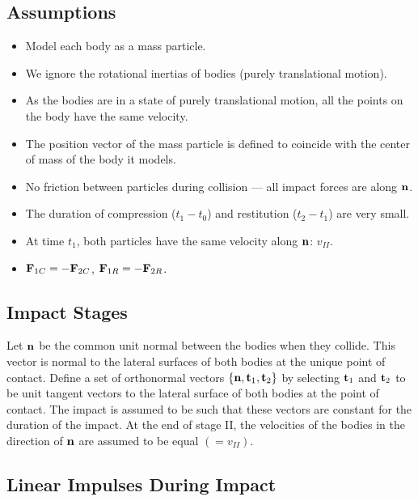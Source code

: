 \documentclass[
  letterpaper,
  DIV=11,
  numbers=noendperiod]{scrreprt}
\providecommand{\tightlist}{%
  \setlength{\itemsep}{0pt}\setlength{\parskip}{0pt}}
\begin{document}
\subsection{Assumptions}\label{assumptions}

\begin{itemize}
\tightlist
\item
  Model each body as a mass particle.
\item
  We ignore the rotational inertias of bodies (purely translational
  motion).
\item
  As the bodies are in a state of purely translational motion, all the
  points on the body have the same velocity.
\item
  The position vector of the mass particle is defined to coincide with
  the center of mass of the body it models.
\item
  No friction between particles during collision --- all impact forces
  are along \({\bf n}\).
\item
  The duration of compression (\(t_1-t_0\)) and restitution
  (\(t_2-t_1\)) are very small.
\item
  At time \(t_1\), both particles have the same velocity along
  \({\bf n}\): \(v_{II}\).
\item
  \({\bf F}_{1C} = -{\bf F}_{2C}\), \({\bf F}_{1R} = -{\bf F}_{2R}\).
\end{itemize}

\subsection{Impact Stages}\label{impact-stages}

Let \({\bf n}\) be the common unit normal between the bodies when they
collide. This vector is normal to the lateral surfaces of both bodies at
the unique point of contact. Define a set of orthonormal vectors
\(\{{\bf n},{\bf t}_1,{\bf t}_2\}\) by selecting \({\bf t}_1\) and
\({\bf t}_2\) to be unit tangent vectors to the lateral surface of both
bodies at the point of contact. The impact is assumed to be such that
these vectors are constant for the duration of the impact. At the end of
stage II, the velocities of the bodies in the direction of \({\bf n}\)
are assumed to be equal \((=v_{II})\).

\subsection{Linear Impulses During
Impact}\label{linear-impulses-during-impact}
\end{document}
